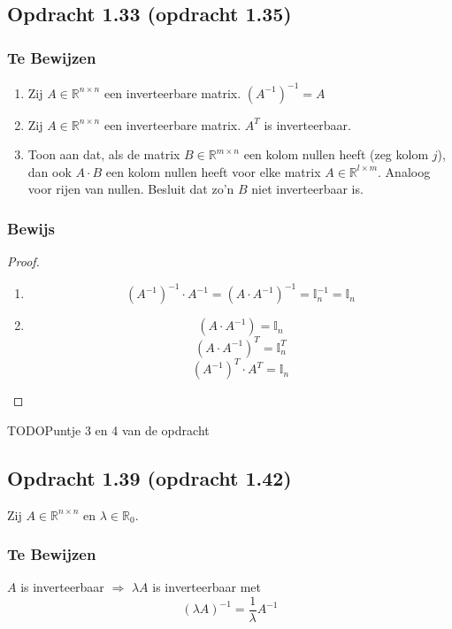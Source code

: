 \documentclass[lineaire_algebra_oplossingen.tex]{subfiles}
\begin{document}
\subsection{Opdracht 1.33 (opdracht 1.35) }
\label{1.33}

\subsubsection*{Te Bewijzen}
\begin{enumerate}
\item
Zij $A \in \mathbb{R}^{n\times n}$ een inverteerbare matrix.
$(A^{-1})^{-1} = A$

\item
Zij $A \in \mathbb{R}^{n\times n}$ een inverteerbare matrix.
$A^T$ is inverteerbaar.

\item
Toon aan dat, als de matrix $B \in \mathbb{R}^{m\times n}$ een kolom nullen heeft (zeg kolom $j$), dan ook $A\cdot B$ een kolom nullen heeft voor elke matrix $A \in \mathbb{R}^{l\times m}$.
Analoog voor rijen van nullen.
Besluit dat zo'n $B$ niet inverteerbaar is.
\end{enumerate}

\subsubsection*{Bewijs}
\begin{proof}
\hfill
\begin{enumerate}
\item
\[
(A^{-1})^{-1}\cdot A^{-1} = (A \cdot A^{-1})^{-1} = \mathbb{I}_n^{-1} = \mathbb{I}_n
\]

\item
\[
(A\cdot A^{-1}) = \mathbb{I}_n
\]
\[
(A\cdot A^{-1})^T = \mathbb{I}_n^T
\]
\[
(A^{-1})^T \cdot A^T= \mathbb{I}_n
\]
\end{enumerate}
\end{proof}
TODO{Puntje 3 en 4 van de opdracht}

\subsection{Opdracht 1.39 (opdracht 1.42)}
\label{1.39}
Zij $A\in \mathbb{R}^{n\times n}$ en $\lambda \in \mathbb{R}_0$.
\subsubsection*{Te Bewijzen}
$A$ is inverteerbaar $\Rightarrow$ $\lambda A$ is inverteerbaar met 
\[
(\lambda A)^{-1} = \frac{1}{\lambda}A^{-1}
\]
\end{document}
